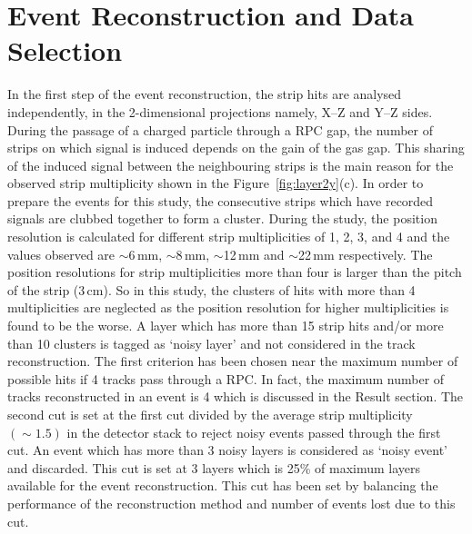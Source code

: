 \section{Event Reconstruction and Data Selection}\label{sec:reconstrction}
In the first step of the event reconstruction, the strip hits are analysed
independently, in the 2-dimensional projections namely,
\mbox{X--Z} and \mbox{Y--Z} sides. During the passage of a charged
particle through a RPC gap, the number of strips on which signal is
induced depends on the gain of the gas gap. This sharing of the induced
signal between the neighbouring strips is the main reason for the
observed strip multiplicity shown in the Figure~\ref{fig:layer2y}(c).
In order to prepare the events for this study, the consecutive strips
which have recorded signals are clubbed together to form a cluster.
During the study, the position resolution is calculated for different
strip multiplicities of 1, 2, 3, and 4 and the values observed are
$\sim$6\,mm, $\sim$8\,mm, $\sim$12\,mm and $\sim$22\,mm respectively.
The position resolutions for strip multiplicities more than four is
larger than the pitch of the strip (3\,cm). So in this study,
the clusters of hits with more than 4 multiplicities are neglected
as the position resolution for higher multiplicities is found to be
the worse.
A layer which has more than 15 strip hits and/or more than 10 clusters
is tagged as `noisy layer' and not considered in the track
reconstruction. The first criterion has been chosen near the maximum
number of possible hits if 4 tracks pass through a RPC.
In fact, the maximum number of tracks reconstructed in an event is 4
which is discussed in the Result section. The second cut is set at
the first cut divided by the average strip multiplicity
$\left(\sim 1.5\right)$ in the detector stack to reject noisy events
passed through the first cut.
An event which has more than 3 noisy layers is considered as `noisy
event' and discarded. This cut is set at 3 layers which is 25\% of
maximum layers available for the event reconstruction. This cut has
been set by balancing the performance of the reconstruction method
and number of events lost due to this cut.

